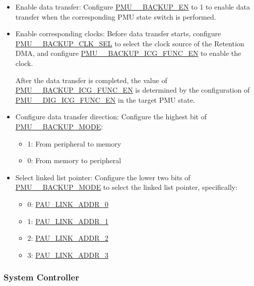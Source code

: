 \documentclass[main\_\_EN.tex]{subfiles}
\begin{document}
\begin{itemize}
    \item Enable data transfer: Configure \hyperref[fielddesc:PMUHPSLEEP2ACTIVEBACKUPEN]{PMU\_\_BACKUP\_EN} to 1 to enable data transfer when the corresponding PMU state switch is performed.
    \item Enable corresponding clocks: Before data transfer starts, configure \hyperref[fielddesc:PMUHPMODEM2ACTIVEBACKUPCLKSEL]{PMU\_\_BACKUP\_CLK\_SEL} to select the clock source of the Retention DMA, and configure \hyperref[fielddesc:PMUHPACTIVEBACKUPICGFUNCEN]{PMU\_\_BACKUP\_ICG\_FUNC\_EN} to enable the clock.

    After the data transfer is completed, the value of \hyperref[fielddesc:PMUHPACTIVEBACKUPICGFUNCEN]{PMU\_\_BACKUP\_ICG\_FUNC\_EN} is determined by the configuration of \hyperref[fielddesc:PMUHPACTIVEDIGICGFUNCEN]{PMU\_\_DIG\_ICG\_FUNC\_EN} in the target PMU state.

    \item Configure data transfer direction: Configure the highest bit of \hyperref[fielddesc:PMUHPMODEM2ACTIVEBACKUPMODEMCLKCODE]{PMU\_\_BACKUP\_MODE}:
    \begin{itemize}
        \item 1: From peripheral to memory
        \item 0: From memory to peripheral
    \end{itemize}
    \item Select linked list pointer: Configure the lower two bits of \hyperref[fielddesc:PMUHPMODEM2ACTIVEBACKUPMODEMCLKCODE]{PMU\_\_BACKUP\_MODE} to select the linked list pointer, specifically:
        \begin{itemize}
            \item 0: \hyperref[fielddesc:PAULINKADDR0]{PAU\_LINK\_ADDR\_0}
            \item 1: \hyperref[fielddesc:PAULINKADDR1]{PAU\_LINK\_ADDR\_1}
            \item 2: \hyperref[fielddesc:PAULINKADDR2]{PAU\_LINK\_ADDR\_2}
            \item 3: \hyperref[fielddesc:PAULINKADDR3]{PAU\_LINK\_ADDR\_3}
        \end{itemize}
\end{itemize}

\subsubsection{System Controller}
\end{document}
